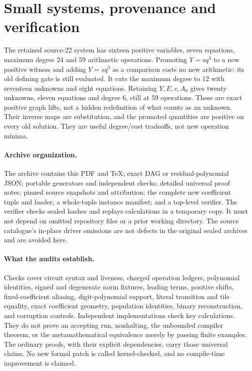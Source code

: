 \documentclass[11pt]{article}
\begin{document}
\section{Small systems, provenance and verification}
The retained source-22 system has sixteen positive variables, seven equations,
maximum degree $24$ and $59$ arithmetic operations. Promoting $Y=sq^3$ to
a new positive witness and adding $Y=sq^3$ as a comparison costs no new
arithmetic: its old defining gate is still evaluated. It cuts the maximum
degree to $12$ with seventeen unknowns and eight equations. Retaining
$Y,E,c,A_0$ gives twenty unknowns, eleven equations and degree $6$, still
at $59$ operations. These are exact positive graph lifts, not a hidden
redefinition of what counts as an unknown. Their inverse maps are substitution,
and the promoted quantities are positive on every old solution. They are
useful degree/cost tradeoffs, not new operation minima.

\paragraph{Archive organization.}
The archive contains this PDF and TeX; exact DAG or residual-polynomial
JSON; portable generators and independent checks; detailed universal proof
notes; pinned source snapshots and attribution; the complete new coefficient
tuple and loader; a whole-tuple instance manifest; and a top-level verifier.
The verifier checks sealed hashes and replays calculations in a temporary
copy. It must not depend on omitted repository files or a prior working
directory. The source catalogue's in-place driver omissions are not defects
in the original sealed archives and are avoided here.

\paragraph{What the audits establish.}
Checks cover circuit syntax and liveness, charged operation ledgers,
polynomial identities, signed and degenerate norm fixtures, leading terms,
positive shifts, fixed-coefficient aliasing, digit-polynomial support,
literal transition and tile equality, exact coefficient geometry, population
identities, binary reconstruction, and corruption controls. Independent
implementations check key calculations. They do not prove an accepting run,
nonhalting, the unbounded compiler theorem, or the metamathematical equivalence
merely by passing finite examples. The ordinary proofs, with their explicit
dependencies, carry those universal claims. No new formal patch is called
kernel-checked, and no compile-time improvement is claimed.
\end{document}
